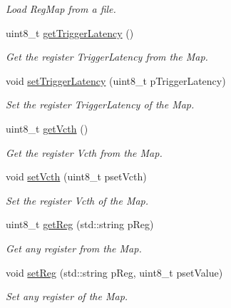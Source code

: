 \begin{DoxyCompactItemize}
\begin{DoxyCompactList}\small\item\em Load Reg\-Map from a file. \end{DoxyCompactList}\item 
uint8\-\_\-t \hyperlink{class_ph2___hw_description_1_1_cbc_a7dcee2bd6f0cbe1e9342f4d8e4229477}{get\-Trigger\-Latency} ()
\begin{DoxyCompactList}\small\item\em Get the register Trigger\-Latency from the Map. \end{DoxyCompactList}\item 
void \hyperlink{class_ph2___hw_description_1_1_cbc_af2ca8a515be91e594345f59765eedc86}{set\-Trigger\-Latency} (uint8\-\_\-t p\-Trigger\-Latency)
\begin{DoxyCompactList}\small\item\em Set the register Trigger\-Latency of the Map. \end{DoxyCompactList}\item 
uint8\-\_\-t \hyperlink{class_ph2___hw_description_1_1_cbc_ad52630f4caa9defc0c46e38c7f828d5f}{get\-Vcth} ()
\begin{DoxyCompactList}\small\item\em Get the register Vcth from the Map. \end{DoxyCompactList}\item 
void \hyperlink{class_ph2___hw_description_1_1_cbc_a055db371622ef5e565d7abd490d1b5bd}{set\-Vcth} (uint8\-\_\-t pset\-Vcth)
\begin{DoxyCompactList}\small\item\em Set the register Vcth of the Map. \end{DoxyCompactList}\item 
uint8\-\_\-t \hyperlink{class_ph2___hw_description_1_1_cbc_a8e29ea3bf86977585b3824941d948f91}{get\-Reg} (std\-::string p\-Reg)
\begin{DoxyCompactList}\small\item\em Get any register from the Map. \end{DoxyCompactList}\item 
void \hyperlink{class_ph2___hw_description_1_1_cbc_aa24292fe56d6b19ec08ba67f9790b5c7}{set\-Reg} (std\-::string p\-Reg, uint8\-\_\-t pset\-Value)
\begin{DoxyCompactList}\small\item\em Set any register of the Map. \end{DoxyCompactList}\item 

\end{DoxyCompactItemize}
